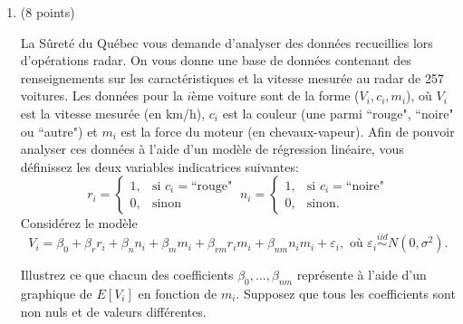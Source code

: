 \documentclass[11pt]{article}
\begin{document}
{\begin{enumerate}
\newpage



\item (8 points)

La S\^uret\'e du Qu\'ebec vous demande d'analyser des donn\'ees
recueillies lors d'op\'erations radar. On vous donne une base de donn\'ees contenant des
renseignements sur les caract\'eristiques et la vitesse mesur\'ee
au radar de 257 voitures. Les donn\'ees pour la $i$\`eme voiture
sont de la forme ($V_i,c_i,m_i$), o\`u $V_i$ est la vitesse
mesur\'ee (en km/h), $c_i$ est la couleur (une parmi ``rouge",
 ``noire" ou ``autre") et $m_i$ est la force du moteur
(en chevaux-vapeur). Afin de pouvoir analyser ces donn\'ees \`a
l'aide d'un mod\`ele de r\'egression lin\'eaire, vous d\'efinissez
les deux variables indicatrices suivantes:
$$r_i=\left\{\begin{array}{ll}
1, & \mbox{si }  c_i=\mbox{``rouge"}\\
0, & \mbox{sinon}\end{array}\right.\ n_i=\left\{\begin{array}{ll}
1, & \mbox{si } c_i=\mbox{``noire"}\\
0, & \mbox{sinon.}\end{array}\right.$$ Consid\'erez le mod\`ele
$$V_i=\beta_0+\beta_rr_i+\beta_nn_i+\beta_mm_i+
\beta_{rm}r_im_i+\beta_{nm}n_im_i+\varepsilon_i, \mbox{ où } \varepsilon_i \overset{iid}{\sim} N(0,\sigma^2).$$



Illustrez ce que chacun des coefficients
$\beta_0,\ldots,\beta_{nm}$ repr\'esente \`a l'aide d'un graphique de
$E[V_i]$ en fonction de $m_i$.
Supposez que tous les coefficients sont non nuls et de valeurs différentes.




\end{enumerate}}
\end{document}
